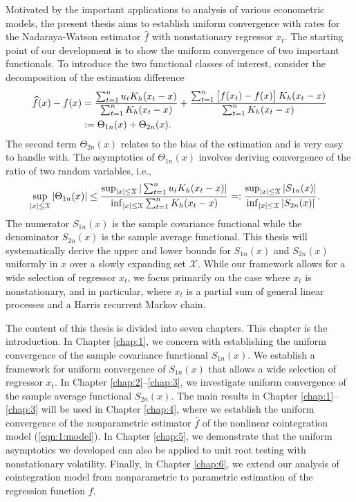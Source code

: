 Motivated by the important applications to analysis of various econometric models, the present thesis aims to establish uniform convergence with rates for the Nadaraya-Watson estimator $\widehat{f}$ with nonstationary regressor $x_t$. The starting point of our development is to show the uniform convergence of two important functionals. To introduce the two functional classes of interest, consider the decomposition of the estimation difference
\begin{align}
	\widehat{f}(x)-f(x) &= \frac{\sum_{t=1}^{n}u_{t}K_{h}(x_{t}-x)}{ \sum_{t=1}^{n}K_{h}(x_{t}-x)}+\frac{\sum_{t=1}^{n}\big[f(x_{t})-f(x)\big] \,K_{h}(x_{t}-x)}{\sum_{t=1}^{n}K_{h}(x_{t}-x)} \nonumber\\
&:= \Theta_{1n}(x)+\Theta_{2n}(x).\nonumber
\end{align}
The second term $\Theta_{2n}(x)$ relates to the bias of the estimation and is very easy to handle with. The asymptotics of $\Theta_{1n}(x)$ involves deriving convergence of the ratio of two random variables, i.e.,
\begin{align}
 \sup_{|x| \le \mathcal{X}} |\Theta_{1n}(x)| &\le \frac{\sup_{|x| \le \mathcal{X}}|\sum_{t=1}^{n}u_{t}K_h(x_{t}-x)|}{\inf_{|x| \le \mathcal{X}}\sum_{t=1}^{n}K_h(x_{t}-x)}  =: \frac{\sup_{|x| \le \mathcal{X}}|S_{1n}(x)|}{\inf_{|x| \le \mathcal{X}}|S_{2n}(x)|}. \nonumber
\end{align}
The numerator $S_{1n}(x)$ is the sample covariance functional while the denominator $S_{2n}(x)$ is the sample average functional. This thesis will systematically derive the upper and lower bounds for $S_{1n}(x)$ and $S_{2n}(x)$ uniformly in $x$ over a slowly expanding set $\mathcal{X}$. While our framework allows for a wide selection of regressor $x_t$, we focus primarily on the case where $x_t$ is nonstationary, and in particular, where $x_t$ is a partial sum of general linear processes and a Harris recurrent Markov chain.

The content of this thesis is divided into seven chapters. This chapter is the introduction. In Chapter \ref{chap:1}, we concern with establishing the uniform convergence of the sample covariance functional $S_{1n}(x)$. We establish a framework for uniform convergence of $S_{1n}(x)$ that allows a wide selection of regressor $x_t$. In Chapter \ref{chap:2}--\ref{chap:3}, we investigate uniform convergence of the sample average functional $S_{2n}(x)$. The main results in Chapter \ref{chap:1}--\ref{chap:3} will be used in Chapter \ref{chap:4}, where we establish the uniform convergence of the nonparametric estimator $\widehat{f}$ of the nonlinear cointegration model (\ref{eqn:1:model}). In Chapter \ref{chap:5}, we demonstrate that the uniform asymptotics we developed can also be applied to unit root testing with nonstationary volatility. Finally, in Chapter \ref{chap:6}, we extend our analysis of cointegration model from nonparametric to parametric estimation of the regression function $f$.

